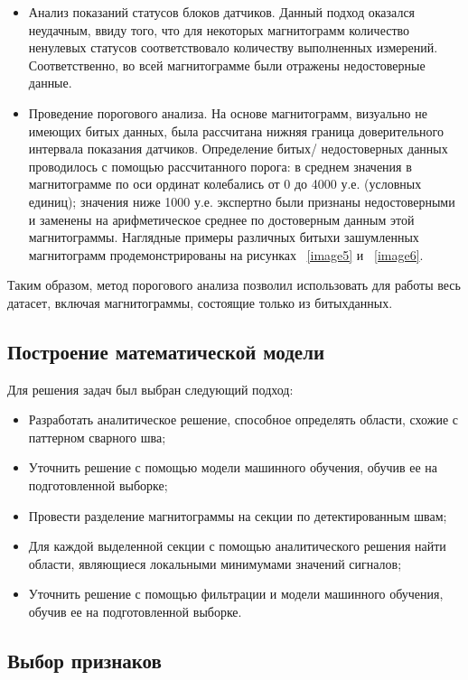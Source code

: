 \documentclass[a4paper,article,14pt]{extarticle}
\begin{document}
\begin{itemize}
    \item Анализ показаний статусов блоков датчиков. Данный подход оказался неудачным, ввиду того, что для некоторых магнитограмм количество ненулевых статусов соответствовало количеству выполненных измерений. Соответственно, во всей магнитограмме были отражены недостоверные данные.
    \item Проведение порогового анализа. На основе магнитограмм, визуально не имеющих битых данных, была рассчитана нижняя граница доверительного интервала показания датчиков. Определение \flqq битых\frqq / недостоверных данных проводилось с помощью рассчитанного порога: в среднем значения в магнитограмме по оси ординат колебались от 0 до 4000 у.е. (условных единиц); значения ниже 1000 у.е. экспертно были признаны недостоверными и заменены на арифметическое среднее по достоверным данным этой магнитограммы. Наглядные примеры различных \flqq битых\frqq и зашумленных магнитограмм продемонстрированы на рисунках ~\ref{image5} и ~\ref{image6}.
\end{itemize}

Таким образом, метод порогового анализа позволил использовать для работы весь датасет, 
включая магнитограммы, состоящие только из \flqq битых\frqq данных. 

\subsection{Построение математической модели}

Для решения задач был выбран следующий подход:
\begin{itemize}
    \item Разработать аналитическое решение, способное определять области, схожие с паттерном сварного шва;
    \item Уточнить решение с помощью модели машинного обучения, обучив ее на подготовленной выборке;
    \item Провести разделение магнитограммы на секции по детектированным швам;
    \item Для каждой выделенной секции с помощью аналитического решения найти области, являющиеся локальными минимумами значений сигналов;
    \item Уточнить решение с помощью фильтрации и модели машинного обучения, обучив ее на подготовленной выборке.
\end{itemize}

\subsection{Выбор признаков}
\end{document}
